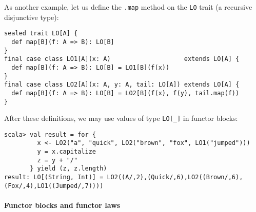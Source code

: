 As another example, let us define the \lstinline!.map! method on
the \lstinline!LO! trait (a recursive disjunctive type):
\begin{lstlisting}
sealed trait LO[A] {
  def map[B](f: A => B): LO[B]
}
final case class LO1[A](x: A)                    extends LO[A] {
  def map[B](f: A => B): LO[B] = LO1[B](f(x))
}
final case class LO2[A](x: A, y: A, tail: LO[A]) extends LO[A] {
  def map[B](f: A => B): LO[B] = LO2[B](f(x), f(y), tail.map(f))
}
\end{lstlisting}
After these definitions, we may use values of type \lstinline!LO[_]!
in functor blocks:
\begin{lstlisting}
scala> val result = for {
         x <- LO2("a", "quick", LO2("brown", "fox", LO1("jumped")))
         y = x.capitalize
         z = y + "/"
       } yield (z, z.length)
result: LO[(String, Int)] = LO2((A/,2),(Quick/,6),LO2((Brown/,6),(Fox/,4),LO1((Jumped/,7))))
\end{lstlisting}


\paragraph{Functor blocks and functor laws}

